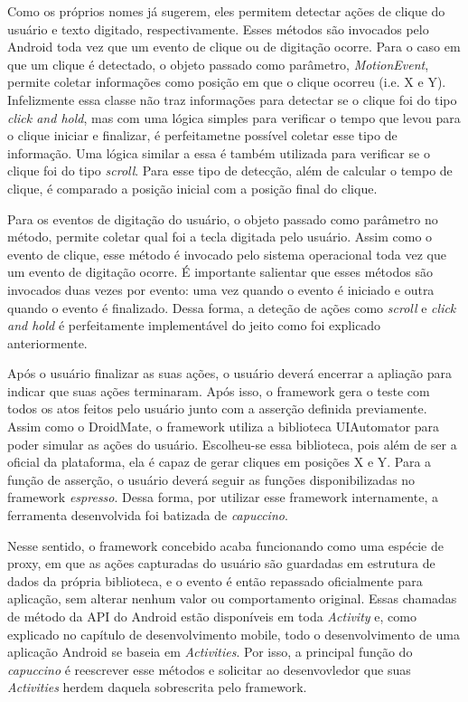 \documentclass[
    12pt,       %
    openright,      %
    twoside,      %
    a4paper,      %
    english,      %
    french,       %
    spanish,      %
    brazil,       %
    ]{abntex2}
\begin{document}
        Como os próprios nomes já sugerem, eles permitem detectar ações de clique do usuário
        e texto digitado, respectivamente. Esses métodos são invocados pelo Android toda
        vez que um evento de clique ou de digitação ocorre. Para o caso em que um clique
        é detectado, o objeto passado como parâmetro, \textit{MotionEvent}, permite coletar
        informações como posição em que o clique ocorreu (i.e. X e Y). Infelizmente essa classe
        não traz informações para detectar se o clique foi do tipo \textit{click and hold}, mas
        com uma lógica simples para verificar o tempo que levou para o clique iniciar e
        finalizar, é perfeitametne possível coletar esse tipo de informação. Uma lógica similar
        a essa é também utilizada para verificar se o clique foi do tipo \textit{scroll}. Para
        esse tipo de detecção, além de calcular o tempo de clique, é comparado a posição inicial
        com a posição final do clique.

        Para os eventos de digitação do usuário, o objeto passado como parâmetro no método, permite
        coletar qual foi a tecla digitada pelo usuário. Assim como o evento de clique, esse método é
        invocado pelo sistema operacional toda vez que um evento de digitação ocorre. É importante
        salientar que esses métodos são invocados duas vezes por evento: uma vez quando o evento é
        iniciado e outra quando o evento é finalizado. Dessa forma, a deteção de ações como
        \textit{scroll} e \textit{click and hold} é perfeitamente implementável do jeito como foi
        explicado anteriormente.

        Após o usuário finalizar as suas ações, o usuário deverá encerrar a apliação para indicar
        que suas ações terminaram. Após isso, o framework gera o teste com todos os atos feitos pelo usuário
        junto com a asserção definida previamente. Assim como o DroidMate, o framework utiliza
        a biblioteca UIAutomator para poder simular as ações do usuário. Escolheu-se essa biblioteca,
        pois além de ser a oficial da plataforma, ela é capaz de gerar cliques em posições X e Y.
        Para a função de asserção, o usuário deverá seguir as funções disponibilizadas no framework
        \textit{espresso}. Dessa forma, por utilizar esse framework internamente, a ferramenta
        desenvolvida foi batizada de \textit{capuccino}.

        Nesse sentido, o framework concebido acaba funcionando como uma espécie de proxy, em que as
        ações capturadas do usuário são guardadas em estrutura de dados da própria biblioteca, e o
        evento é então repassado oficialmente para aplicação, sem alterar nenhum valor ou comportamento
        original. Essas chamadas de método da API do Android estão disponíveis em toda \textit{Activity}
        e, como explicado no capítulo de desenvolvimento mobile, todo o desenvolvimento de uma aplicação
        Android se baseia em \textit{Activities}. Por isso, a principal função do \textit{capuccino} é
        reescrever esse métodos e solicitar ao desenvovledor que suas \textit{Activities} herdem daquela
        sobrescrita pelo framework.
\end{document}
